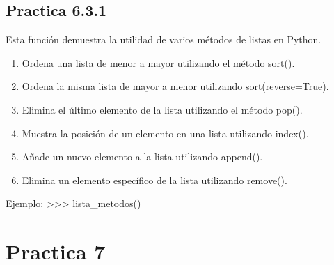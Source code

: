\documentclass[letterpaper,10pt,spanish]{sphinxmanual}
\begin{document}
\section{Practica 6.3.1}
\label{\detokenize{pr6:module-pr6.3_1}}\label{\detokenize{pr6:practica-6-3-1}}

\begin{fulllineitems}
\label{\detokenize{pr6:pr6.3_1.lista_metodos}}
\pysigstartsignatures
{}
\pysigstopsignatures
\sphinxAtStartPar
Esta función demuestra la utilidad de varios métodos de listas en Python.
\begin{enumerate}
%
\item {} 
\sphinxAtStartPar
Ordena una lista de menor a mayor utilizando el método sort().

\item {} 
\sphinxAtStartPar
Ordena la misma lista de mayor a menor utilizando sort(reverse=True).

\item {} 
\sphinxAtStartPar
Elimina el último elemento de la lista utilizando el método pop().

\item {} 
\sphinxAtStartPar
Muestra la posición de un elemento en una lista utilizando index().

\item {} 
\sphinxAtStartPar
Añade un nuevo elemento a la lista utilizando append().

\item {} 
\sphinxAtStartPar
Elimina un elemento específico de la lista utilizando remove().

\end{enumerate}

\sphinxAtStartPar
Ejemplo:
\textgreater{}\textgreater{}\textgreater{} lista\_metodos()

\end{fulllineitems}


\sphinxstepscope


\chapter{Practica 7}
\label{\detokenize{pr7:practica-7}}\label{\detokenize{pr7::doc}}
\end{document}
